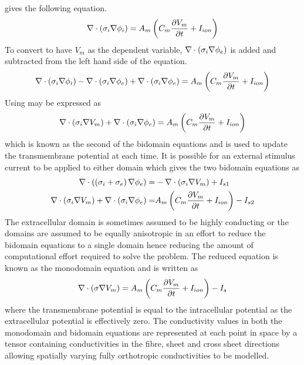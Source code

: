 gives the following equation.
\begin{equation}
    \nabla   \cdot  \left( \sigma_i  \nabla {\phi_i} \right)  =
   A_m \left( C_m  \dfrac{\partial V_m}{\partial t}  + I_{ion} \right)
  \label{eqn:membrane_current_flow_conserv}
\end{equation}
To convert  to have $V_m$ as the
dependent variable, $  \nabla   \cdot  \left( \sigma_i  \nabla {\phi_e} \right) $ is
added and subtracted from the left hand side of the equation.
\begin{equation}
    \nabla   \cdot  \left( \sigma_i  \nabla {\phi_i} \right)  -
    \nabla   \cdot  \left( \sigma_i  \nabla {\phi_e} \right)  +
    \nabla   \cdot  \left( \sigma_i  \nabla {\phi_e} \right)  =
   A_m \left( C_m  \dfrac{\partial V_m}{\partial t}  + I_{ion} \right)
  \label{eqn:membrane_current_flow_conserv2}
\end{equation}
Using 
 may be expressed as 
\begin{equation}
    \nabla   \cdot  \left( \sigma_i  \nabla {V_m} \right)  +
    \nabla   \cdot  \left( \sigma_i  \nabla {\phi_e} \right)  =
   A_m \left( C_m  \dfrac{\partial V_m}{\partial t}  + I_{ion} \right)
  \label{eqn:second_bidomain_equation}
\end{equation}
which is known as the second of the bidomain equations and is used to update
the transmembrane potential at each time. It is possible for an
external stimulus current to be applied to either domain which gives the two
bidomain equations as
\begin{align}
    \nabla   \cdot  \left( \left( \sigma_i + \sigma_e \right)  \nabla {\phi_e} \right)  =&
  -  \nabla   \cdot  \left( \sigma_i  \nabla {V_m} \right)  +I_{s1}\\
    \nabla   \cdot  \left( \sigma_i  \nabla {V_m} \right)  +
    \nabla   \cdot  \left( \sigma_i  \nabla {\phi_e} \right)  =&
   A_m \left( C_m  \dfrac{\partial V_m}{\partial t}  + I_{ion} \right) -I_{s2}
  \label{eqn:starting_bidomain_equations}
\end{align}
The extracellular domain is sometimes assumed to be highly conducting or the
domains are assumed to be equally anisotropic in an
effort to reduce the bidomain equations to a single domain hence reducing the
amount of computational effort required to solve the problem. The reduced
equation is known as the monodomain equation and is written as
\begin{equation}
    \nabla   \cdot  \left( \sigma  \nabla {V_m} \right)  =
   A_m \left( C_m  \dfrac{\partial V_m}{\partial t}  + I_{ion} \right) -I_{s}
  \label{eqn:starting_monodomain_equation}  
\end{equation}
where the transmembrane potential is equal to the intracellular potential as
the extracellular potential is effectively zero. The conductivity values in
both the monodomain and bidomain equations are represented at each point in
space by a tensor containing conductivities in the fibre, sheet and cross
sheet directions allowing spatially varying fully orthotropic conductivities
to be modelled. 
%
